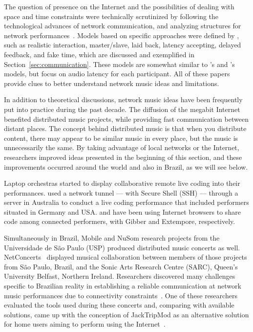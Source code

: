 The question of presence on the Internet and the possibilities of dealing with space and time constraints were technically scrutinized by following the technological advances of network communication, and analyzing structures for network performances~\citep{Carot2007network,Carot2007networked,Carot2008distributed,Carot2009fundamentals,Carot2010low}.
Models based on specific approaches were defined by , such as realistic interaction, master/slave, laid back, latency accepting, delayed feedback, and fake time, which are discussed and exemplified in Section~\ref{sec:communication}.
These models are somewhat similar to 's and 's models, but focus on audio latency for each participant.
All of these papers provide clues to better understand network music ideas and limitations.

In addition to theoretical discussions, network music ideas have been frequently put into practice during the past decade.
The diffusion of the megabit Internet benefited distributed music projects, while providing fast communication between distant places.
The concept behind distributed music is that when you distribute content, there may appear to be similar music in every place, but the music is unnecessarily the same.
By taking advantage of local networks or the Internet, researchers improved ideas presented in the beginning of this section, and these improvements occurred around the world and also in Brazil, as we will see below.

Laptop orchestras started to display collaborative remote live coding into their performances.
\cite{Swift2014networked} used a network tunnel --- with Secure Shell (SSH) --- through a server in Australia to conduct a live coding performance that included performers situated in Germany and USA.
\cite{Roberts2012gibberlivecoding} and \cite{Ogborn2014live} have been using Internet browsers to share code among connected performers, with Gibber and Extempore, respectively.

Simultaneously in Brazil, Mobile and NuSom research projects from the Universidade de São Paulo (USP) produced distributed music concerts as well.
NetConcerts~\citep{Arango2014thesis} displayed musical collaboration between members of those projects from São Paulo, Brazil, and the Sonic Arts Research Centre (SARC), Queen's University Belfast, Northern Ireland.
Researchers discovered many challenges specific to Brazilian reality in establishing a reliable communication at network music performances due to connectivity constraints~\citep{Arango2013challenges,Arango2014thesis}.
One of these researchers evaluated the tools used during these concerts and, comparing with available solutions, came up with the conception of JackTripMod as an alternative solution for home users aiming to perform using the Internet~\citep{Tomiyoshi2013thesis}.

